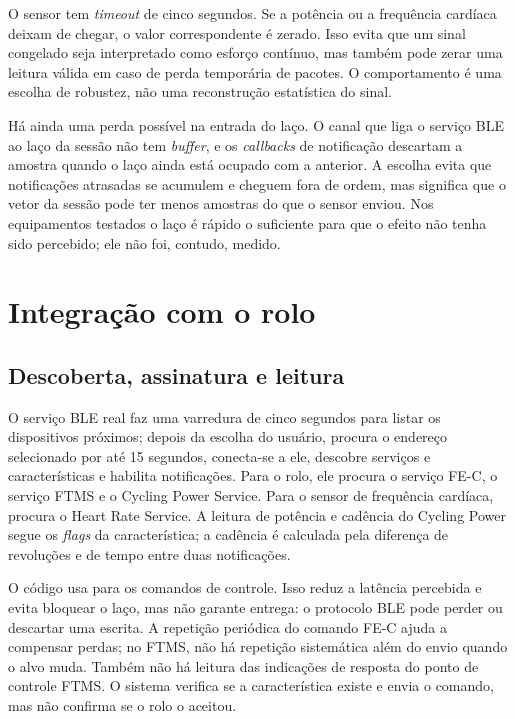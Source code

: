 O sensor tem \textit{timeout} de cinco segundos. Se a potência ou a frequência
cardíaca deixam de chegar, o valor correspondente é zerado. Isso evita que um
sinal congelado seja interpretado como esforço contínuo, mas também pode zerar
uma leitura válida em caso de perda temporária de pacotes. O comportamento é
uma escolha de robustez, não uma reconstrução estatística do sinal.

Há ainda uma perda possível na entrada do laço. O canal que liga o serviço BLE
ao laço da sessão não tem \textit{buffer}, e os \textit{callbacks} de
notificação descartam a amostra quando o laço ainda está ocupado com a anterior.
A escolha evita que notificações atrasadas se acumulem e cheguem fora de ordem,
mas significa que o vetor da sessão pode ter menos amostras do que o sensor
enviou. Nos equipamentos testados o laço é rápido o suficiente para que o
efeito não tenha sido percebido; ele não foi, contudo, medido.

\section{Integração com o rolo}
\label{sec:implementacao-ble}

\subsection{Descoberta, assinatura e leitura}
\label{sec:implementacao-descoberta}

O serviço BLE real faz uma varredura de cinco segundos para listar os
dispositivos próximos; depois da escolha do usuário, procura o endereço
selecionado por até 15 segundos, conecta-se a ele,
descobre serviços e características e habilita notificações. Para o rolo,
ele procura o serviço FE-C, o serviço FTMS e o Cycling Power Service. Para o
sensor de frequência cardíaca, procura o Heart Rate Service. A leitura de
potência e cadência do Cycling Power segue os \textit{flags} da característica;
a cadência é calculada pela diferença de revoluções e de tempo entre duas
notificações.

O código usa  para os comandos de controle. Isso
reduz a latência percebida e evita bloquear o laço, mas não garante entrega: o
protocolo BLE pode perder ou descartar uma escrita. A repetição periódica do
comando FE-C ajuda a compensar perdas; no FTMS, não há repetição sistemática
além do envio quando o alvo muda. Também não há leitura das indicações de
resposta do ponto de controle FTMS. O sistema verifica se a característica
existe e envia o comando, mas não confirma se o rolo o aceitou.

